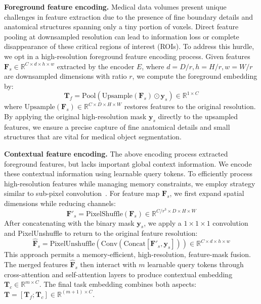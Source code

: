 \noindent\textbf{Foreground feature encoding.} Medical data volumes present unique challenges in feature extraction due to the presence of fine boundary details and anatomical structures spanning only a tiny portion of voxels. Direct feature pooling at downsampled resolution can lead to information loss or complete disappearance of these critical regions of interest (ROIs). To address this hurdle, we opt in a high-resolution foreground feature encoding process. Given features $\boldsymbol{F}_s \in \mathbb{R}^{C \times d \times h \times w}$ extracted by the encoder $E$, where $d=D/r, h=H/r, w=W/r$ are downsampled dimensions with ratio $r$, we compute the foreground embedding by:
\begin{equation}
\boldsymbol{T}_f = \text{Pool}(\text{Upsample}(\boldsymbol{F}_s) \odot \boldsymbol{y}_s) \in \mathbb{R}^{1 \times C}
\end{equation}
where $\text{Upsample}(\boldsymbol{F}_s) \in \mathbb{R}^{C \times D \times H \times W}$ restores features to the original resolution. By applying the original high-resolution mask $\boldsymbol{y}_s$ directly to the upsampled features, we ensure a precise capture of fine anatomical details and small structures that are vital for medical object segmentation.


\noindent\textbf{Contextual feature encoding.} The above encoding process extracted foreground features, but lacks important global context information. We encode these contextual information using learnable query tokens. To efficiently process high-resolution features while managing memory constraints,  we employ strategy similar to sub-pixel convolution~\cite{shi2016real}. For feature map $\boldsymbol{F}_s$, we first expand spatial dimensions while reducing channels:
\begin{equation}
\boldsymbol{F}'_s = \text{PixelShuffle}(\boldsymbol{F}_s) \in \mathbb{R}^{C/r^3 \times D \times H \times W}
\end{equation}
After concatenating with the binary mask $\boldsymbol{y}_s$, we apply a $1\times1\times1$ convolution and PixelUnshuffle to return to the original feature resolution:
\begin{equation}
\hat{\boldsymbol{F}}_s = \text{PixelUnshuffle}(\text{Conv}(\text{Concat}[\boldsymbol{F}'_s, \boldsymbol{y}_s])) \in \mathbb{R}^{C \times d \times h \times w}
\end{equation}
This approach permits a memory-efficient, high-resolution, feature-mask fusion. The merged features $\hat{\boldsymbol{F}}_s$ then interact with $m$ learnable query tokens through cross-attention and self-attention layers to produce contextual embedding $\boldsymbol{T}_c \in \mathbb{R}^{m \times C}$. The final task embedding combines both aspects: $\boldsymbol{T} = [\boldsymbol{T}_f; \boldsymbol{T}_c] \in \mathbb{R}^{(m+1) \times C}$.

